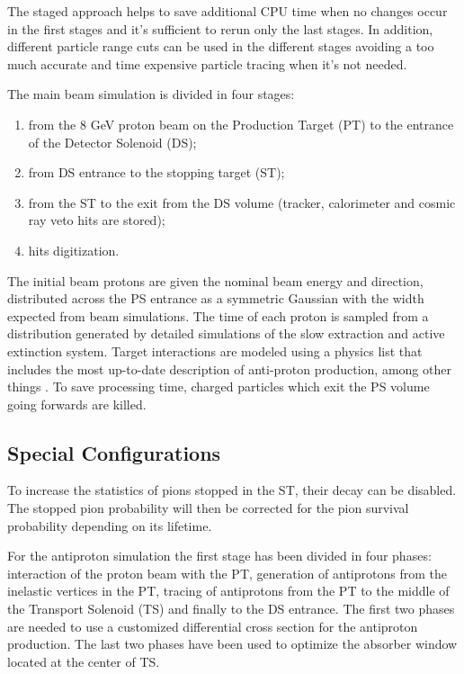 The staged approach helps to save additional CPU time when no changes occur in the first stages and it's sufficient to rerun only the last stages. In addition, different particle range cuts can be used in the different stages avoiding a too much accurate and time expensive particle tracing when it's not needed.  

The main beam simulation is divided in four stages:
\begin{enumerate}
\item from the 8 GeV proton beam on the Production Target (PT) to the entrance of the Detector Solenoid (DS);
\item from DS entrance to the stopping target (ST);
\item from the ST to the exit from the DS volume (tracker, calorimeter and cosmic ray veto hits are stored);
\item hits digitization.
\end{enumerate}

The initial beam protons are given the nominal beam energy and direction, distributed across the PS entrance as a symmetric Gaussian with the width expected from beam simulations.  The time of each proton is sampled from a distribution generated by detailed simulations of the slow extraction and active extinction system. Target interactions are modeled using a physics list that includes the most up-to-date description of anti-proton production, among other things .
To save processing time, charged particles which exit the PS volume going forwards are killed.

\subsection{Special Configurations}
To increase the statistics of pions stopped in the ST, their decay can be disabled. The stopped pion probability will then be corrected for the pion survival probability depending on its lifetime.     

For the antiproton simulation the first stage has been divided in four phases: interaction of the proton beam with the PT, generation of antiprotons from the inelastic vertices in the PT, tracing of antiprotons from the PT to the middle of the Transport Solenoid (TS) and finally to the DS entrance. The first two phases are needed to use a customized differential cross section for the antiproton production. The last two phases have been used to optimize the absorber window located at the center of TS. 

